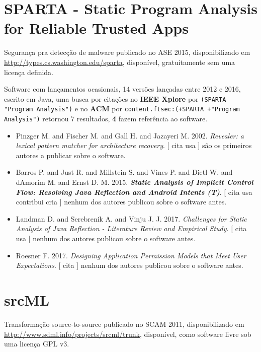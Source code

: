 \section{SPARTA - Static Program Analysis for Reliable Trusted Apps}

Segurança pra detecção de malware
publicado no ASE 2015,
disponibilizado em \url{http://types.cs.washington.edu/sparta},
disponível,
gratuitamente
sem uma licença definida.

Software com lançamentos ocasionais,
14 versões lançadas
entre 2012 e 2016,
escrito em Java,
uma busca por citações no {\bf IEEE Xplore} por
\texttt{(SPARTA "Program Analysis")}
e no {\bf ACM} por
\texttt{content.ftsec:(+SPARTA +"Program Analysis")}
retornou
7 resultados,
{\bf 4} fazem referência ao software.

\begin{itemize}
\item Pinzger M. and Fischer M. and Gall H. and Jazayeri M.
      2002.
        \textit{ Revealer: a lexical pattern matcher for architecture recovery}.
      [
          cita
          usa
      ]
são os primeiros autores a publicar sobre o software.
\item Barros P. and Just R. and Millstein S. and Vines P. and Dietl W. and dAmorim M. and Ernst D. M.
      2015.
        \textbf{\textit{ Static Analysis of Implicit Control Flow: Resolving Java Reflection and Android Intents (T)}}.
      [
          cita
          usa
          contribui
          cria
      ]
nenhum dos autores publicou sobre o software antes.
\item Landman D. and Serebrenik A. and Vinju J. J.
      2017.
        \textit{ Challenges for Static Analysis of Java Reflection - Literature Review and Empirical Study}.
      [
          cita
          usa
      ]
nenhum dos autores publicou sobre o software antes.
\item Roesner F.
      2017.
        \textit{ Designing Application Permission Models that Meet User Expectations}.
      [
          cita
      ]
nenhum dos autores publicou sobre o software antes.
\end{itemize}
\section{srcML}

Transformação source-to-source
publicado no SCAM 2011,
disponibilizado em \url{http://www.sdml.info/projects/srcml/trunk},
disponível,
como software livre
sob uma licença GPL v3.

